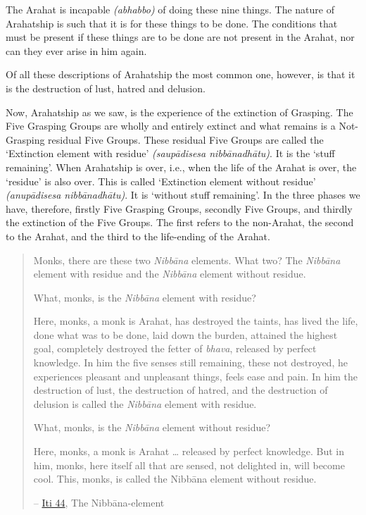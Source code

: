 The Arahat is incapable \emph{(abhabbo)} of doing these nine things. The nature of Arahatship is such that it is  for these things to be done. The conditions that must be present if these things are to be done are not present in the Arahat, nor can they ever arise in him again.

Of all these descriptions of Arahatship the most common one, however, is that it is the destruction of lust, hatred and delusion.

\protect\hypertarget{remainder}{}{}Now, Arahatship as we saw, is the experience of the extinction of Grasping. The Five Grasping Groups are wholly and entirely extinct and what remains is a Not-Grasping residual Five Groups. These residual Five Groups are called the `Extinction element with residue' \emph{(saupādisesa nibbānadhātu)}. It is the `stuff remaining'. When Arahatship is over, i.e., when the life of the Arahat is over, the `residue' is also over. This is called `Extinction element without residue' \emph{(anupādisesa nibbānadhātu)}. It is `without stuff remaining'. In the three phases we have, therefore, firstly Five Grasping Groups, secondly Five Groups, and thirdly the extinction of the Five Groups. The first refers to the non-Arahat, the second to the Arahat, and the third to the life-ending of the Arahat.

\begin{quote}
Monks, there are these two \emph{Nibbāna} elements. What two? The \emph{Nibbāna} element with residue and the \emph{Nibbāna} element without residue.

What, monks, is the \emph{Nibbāna} element with residue?

Here, monks, a monk is Arahat, has destroyed the taints, has lived the life, done what was to be done, laid down the burden, attained the highest goal, completely destroyed the fetter of \emph{bhava}, released by perfect knowledge. In him the five senses still remaining, these not destroyed, he experiences pleasant and unpleasant things, feels ease and pain. In him the destruction of lust, the destruction of hatred, and the destruction of delusion is called the \emph{Nibbāna} element with residue.

What, monks, is the \emph{Nibbāna} element without residue?

Here, monks, a monk is Arahat \ldots\hspace{0pt} released by perfect knowledge. But in him, monks, here itself all that are sensed, not delighted in, will become cool. This, monks, is called the Nibbāna element without residue.

 -- \href{https://suttacentral.net/iti44/en/ireland}{Iti 44}, The Nibbāna-element
\end{quote}

